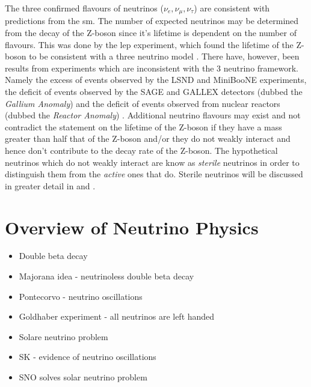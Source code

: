 The three confirmed flavours of neutrinos ($\nu_e, \nu_{\mu}, \nu_{\tau}$) are consistent with predictions from the \Gls{sm}. The number of expected neutrinos may be determined from the decay of the Z-boson since it's lifetime is dependent on the number of flavours. This was done by the \gls{lep} experiment, which found the lifetime of the Z-boson to be consistent with a three neutrino model \cite{Zboson_number_of_neutrinos}\cite{LEP}. There have, however, been results from experiments which are inconsistent with the 3 neutrino framework. Namely the excess of events observed by the LSND and MiniBooNE experiments, the deficit of events observed by the SAGE and GALLEX detectors (dubbed the \textit{Gallium Anomaly}) and the deficit of events observed from nuclear reactors (dubbed the \textit{Reactor Anomaly}) \cite{LSND_excess} \cite{MiniBooNE_excess} \cite{GALLEX} \cite{Gallex_reanalysis} \cite{SAGE} \cite{Reactor_anomaly}. Additional neutrino flavours may exist and not contradict the statement on the lifetime of the Z-boson if they have a mass greater than half that of the Z-boson and/or they do not weakly interact and hence don't contribute to the decay rate of the Z-boson. The hypothetical neutrinos which do not weakly interact are know as \textit{sterile} neutrinos in order to distinguish them from the \textit{active} ones that do. Sterile neutrinos will be discussed in greater detail in  and .

\section{Overview of Neutrino Physics}

\begin{itemize}
    \item Double beta decay
    \item Majorana idea - neutrinoless double beta decay
    \item Pontecorvo - neutrino oscillations
    \item Goldhaber experiment - all neutrinos are left handed
    \item Solare neutrino problem
    \item SK - evidence of neutrino oscillations
    \item SNO solves solar neutrino problem
\end{itemize}

